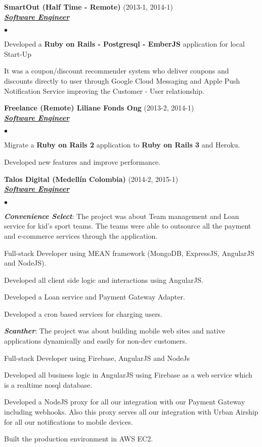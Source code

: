 \documentclass[a4paper]{article}
\newcommand{\employer}[3]{{
\textbf{#1} (#2)\\ \underline{\textbf{\emph{#3}}}\\ }}
\newenvironment{achievements}{\begin{list}{$\bullet$}{\topsep 0pt \itemsep
-2pt}}{\vspace*{4pt}\end{list}}
\newcommand{\programming}[1]{{\textbf{#1}}}
\newcommand{\emphasys}[1]{\textbf{\emph{#1}}}
\begin{document}
\employer{ SmartOut (Half Time - Remote)}{2013-1, 2014-1}{Software Engineer}
\begin{achievements}
\item Developed a \programming{Ruby on Rails - Postgresql - EmberJS} application for local Start-Up
\item It was a coupon/discount recommender system who deliver coupons and discounts directly to user through Google Cloud Messaging and Apple Push Notification Service improving the Customer - User relationship.
\end{achievements}

\employer{ Freelance (Remote)  Liliane Fonds Ong}{2013-2, 2014-1}{Software Engineer}
\begin{achievements}
\item Migrate a \programming{Ruby on Rails 2} application to \programming{Ruby on Rails 3} and Heroku.
\item Developed new features and improve performance.
\end{achievements}

\employer{ Talos Digital (Medell\'in Colombia)}{2014-2, 2015-1}{Software Engineer}
\begin{achievements}
\item \emphasys{Convenience Select}: The project was about Team management and Loan service for kid's sport teams. The teams were able to outsource all the payment and e-commerce services through the application.
\item Full-stack Developer using MEAN framework  (MongoDB, ExpressJS, AngularJS and NodeJS).
\item Developed all client side logic and interactions using AngularJS.
\item Developed a Loan service and Payment Gateway Adapter.
\item Developed a cron based services for charging users.
\item \emphasys{Scanther}: The project was about building mobile web sites and native applications dynamically and easily for non-dev customers.
\item Full-stack Developer using Firebase, AngularJS and NodeJs
\item Developed all business logic in AngularJS using Firebase as a web service which is a realtime nosql database.
\item Developed a NodeJS proxy for all our integration with our Payment Gateway including webhooks. Also this proxy serves all our integration with Urban Airship for all our notifications to mobile devices.
\item Built the production environment in AWS EC2.
\end{achievements}
\end{document}
